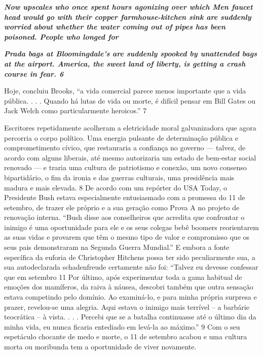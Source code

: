 \par
 

 \textbf{\textit{Now upscales who once spent hours agonizing over which Men faucet head would go with their copper farmhouse-kitchen sink are suddenly worried about whether the water coming out of pipes has been poisoned. People who longed for} }  
 
 
\par
 

 
\par
 

 \textbf{\textit{Prada bags at Bloomingdale's are suddenly spooked by unattended bags at the airport. America, the sweet land of liberty, is getting a crash course in fear. {{\color{blue} 6} } } }  
 
 
\par
 
Hoje, concluiu Brooks, “a vida comercial parece menos importante que a vida pública. . . . Quando há lutas de vida ou morte, é difícil pensar em Bill Gates ou Jack Welch como particularmente heroicos.”
 {\color{blue} 7}  

 
\par
 
Escritores repetidamente acolheram a eletricidade moral galvanizadora que agora percorria o corpo político. Uma energia pulsante de determinação pública e comprometimento cívico, que restauraria a confiança no governo — talvez, de acordo com alguns liberais, até mesmo autorizaria um estado de bem-estar social renovado — e traria uma cultura de patriotismo e conexão, um novo consenso bipartidário, o fim da ironia e das guerras culturais, uma presidência mais madura e mais elevada.
 {\color{blue} 8}  
De acordo com um repórter do USA Today, o Presidente Bush estava especialmente entusiasmado com a promessa do 11 de setembro, de trazer ele próprio e a sua geração como Prova A no projeto de renovação interna. “Bush disse aos conselheiros que acredita que confrontar o inimigo é uma oportunidade para ele e os seus colegas bebê boomers reorientarem as suas vidas e provarem que têm o mesmo tipo de valor e compromisso que os seus pais demonstraram na Segunda Guerra Mundial.” E embora a fonte específica da euforia de Christopher Hitchens possa ter sido peculiarmente sua, a sua autodeclarada schadenfreude certamente não foi: “Talvez eu devesse confessar que em setembro
 {\color{blue} 11}  
Por último, após experimentar toda a gama habitual de emoções dos mamíferos, da raiva à náusea, descobri também que outra sensação estava competindo pelo domínio. Ao examiná-lo, e para minha própria surpresa e prazer, revelou-se uma alegria. Aqui estava o inimigo mais terrível – a barbárie teocrática – à vista. . . . Percebi que se a batalha continuasse até o último dia da minha vida, eu nunca ficaria entediado em levá-la ao máximo.”
 {\color{blue} 9}  
Com o seu espetáculo chocante de medo e morte, o 11 de setembro acabou e uma cultura morta ou moribunda tem a oportunidade de viver novamente.
 
